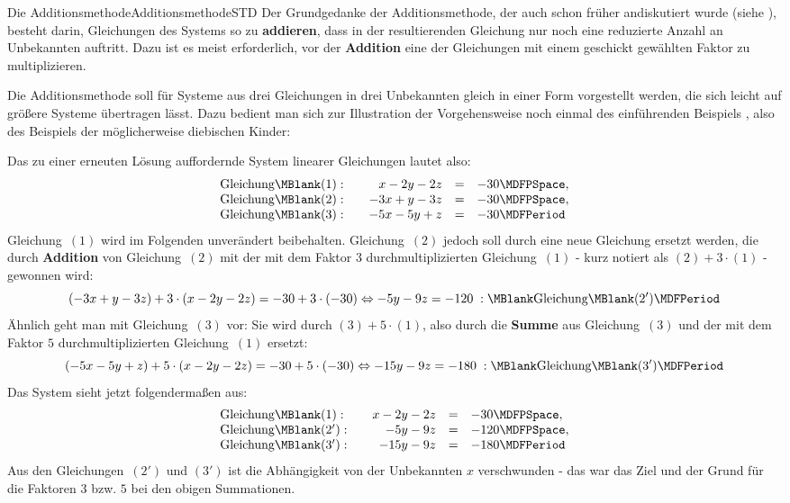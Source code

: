 \begin{MXContent}{Die Additionsmethode}{Additionsmethode}{STD}
Der Grundgedanke der Additionsmethode, der auch schon früher andiskutiert wurde (siehe ),
besteht darin, Gleichungen des Systems so zu \textbf{addieren}, dass in der resultierenden Gleichung
nur noch eine reduzierte Anzahl an Unbekannten auftritt. Dazu ist es meist erforderlich, vor der \textbf{Addition}
eine der Gleichungen mit einem geschickt gewählten Faktor zu multiplizieren.

Die Additionsmethode soll für Systeme aus drei Gleichungen in drei Unbekannten
gleich in einer Form vorgestellt werden, die sich leicht auf größere Systeme übertragen lässt. Dazu bedient man sich zur
Illustration der Vorgehensweise noch einmal des einführenden Beispiels , also
des Beispiels der möglicherweise diebischen Kinder:
\begin{MExample}
Das zu einer erneuten Lösung auffordernde System linearer Gleichungen lautet also:
$$\begin{array}{lcrcl} \mbox{Gleichung}\MBlank (1): & & x - 2 y - 2 z & = & - 30 \MDFPSpace, \\
\mbox{Gleichung}\MBlank (2): & & - 3 x + y - 3 z & = & - 30 \MDFPSpace, \\
\mbox{Gleichung}\MBlank (3): & & - 5 x - 5 y + z & = & - 30 \MDFPeriod \end{array}$$
Gleichung~$(1)$ wird im Folgenden unverändert beibehalten. Gleichung~$(2)$ jedoch soll durch eine
neue Gleichung ersetzt werden, die durch \textbf{Addition} von Gleichung~$(2)$ mit der mit dem Faktor $3$
durchmultiplizierten Gleichung~$(1)$ - kurz notiert als $(2) + 3 \cdot (1)$ - gewonnen wird:
$$(-3 x + y - 3 z) + 3 \cdot (x - 2 y - 2 z) = - 30 + 3 \cdot (- 30) \Leftrightarrow
- 5 y - 9 z = - 120 \; : \MBlank\mbox{Gleichung}\MBlank (2') \MDFPeriod $$
Ähnlich geht man mit Gleichung~$(3)$ vor: Sie wird durch $(3) + 5 \cdot (1)$, also durch die
\textbf{Summe} aus Gleichung~$(3)$ und der mit dem Faktor $5$ durchmultiplizierten Gleichung~$(1)$ ersetzt:
$$(- 5 x - 5 y + z) + 5 \cdot (x - 2 y - 2 z) = - 30 + 5 \cdot (- 30) \Leftrightarrow
-15 y - 9 z = - 180 \; : \MBlank\mbox{Gleichung}\MBlank (3') \MDFPeriod $$
Das System sieht jetzt folgendermaßen aus:
$$\begin{array}{lcrcl} \mbox{Gleichung}\MBlank (1): & & x - 2 y - 2 z & = & - 30 \MDFPSpace, \\
\mbox{Gleichung}\MBlank (2'): & & - 5 y - 9 z & = & - 120 \MDFPSpace, \\
\mbox{Gleichung}\MBlank (3'): & & - 15 y - 9 z & = & - 180  \MDFPeriod \end{array}$$
Aus den Gleichungen~$(2')$ und $(3')$ ist die Abhängigkeit von der Unbekannten $x$ verschwunden - das war das
Ziel und der Grund für die Faktoren $3$ bzw. $5$ bei den obigen Summationen.


\end{MExample}
\end{MXContent}
